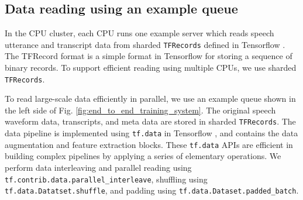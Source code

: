 \documentclass{article}
\begin{document}
\subsection{Data reading using an example queue}
In the CPU cluster, each CPU runs one example server
which reads speech utterance and transcript data from sharded 
{\tt TFRecords} defined in Tensorflow \cite{m_abadi_usenix_2016}.
The TFRecord format is a simple format in Tensorflow for storing 
a sequence of binary records. To support efficient reading using 
multiple CPUs, we use sharded {\tt TFRecords}.

To read large-scale data efficiently in parallel, we use an example queue
shown in the left side of Fig. \ref{fig:end_to_end_training_system}.  
The original speech waveform data, transcripts, and meta data are stored
in sharded {\tt TFRecords}. The data pipeline is implemented using
{\tt tf.data} in Tensorflow \cite{m_abadi_usenix_2016}, 
and contains the data augmentation and feature extraction blocks.
These {\tt tf.data} APIs are efficient in building complex pipelines
by applying a series of elementary operations. We perform data interleaving
and parallel reading using {\tt tf.contrib.data.parallel\_interleave}, 
shuffling using {\tt tf.data.Datatset.shuffle}, and padding using 
{\tt tf.data.Dataset.padded\_batch}.
\end{document}
